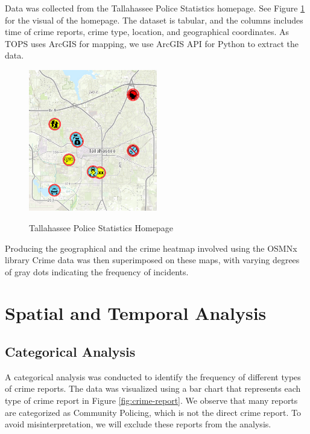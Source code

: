 \documentclass{article}
\begin{document}
Data was collected from the Tallahassee Police Statistics homepage. See Figure \ref{fig:tops} for the visual of the homepage. The dataset is tabular, and the columns includes time of crime reports, crime type, location, and geographical coordinates. As TOPS uses ArcGIS for mapping, we use ArcGIS API for Python to extract the data.

\begin{figure}[!htbp]
    \centering
    \includegraphics[width=0.5\textwidth]{Figures/TOPS.png}
    \label{fig:tops}
    \caption{Tallahassee Police Statistics Homepage}
\end{figure}

Producing the geographical and the crime heatmap involved using the OSMNx library  Crime data was then superimposed on these maps, with varying degrees of gray dots indicating the frequency of incidents.

\section{Spatial and Temporal Analysis}

\subsection{Categorical Analysis}

A categorical analysis was conducted to identify the frequency of different types of crime reports. The data was visualized using a bar chart that represents each type of crime report in Figure \ref{fig:crime-report}. We observe that many reports are categorized as Community Policing, which is not the direct crime report. To avoid misinterpretation, we will exclude these reports from the analysis.
\end{document}
